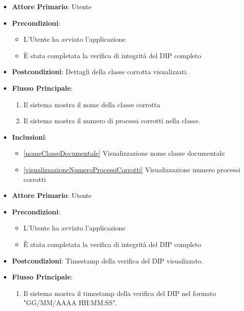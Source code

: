 \begin{itemize}
    \item \textbf{Attore Primario}: Utente
    \item \textbf{Precondizioni}: 
        \begin{itemize}
            \item L'Utente ha avviato l'applicazione
            \item È stata completata la verifica di integrità del DIP completo
        \end{itemize}
    \item \textbf{Postcondizioni}: Dettagli della classe corrotta visualizzati.
    \item \textbf{Flusso Principale}:
        \begin{enumerate}
            \item Il sistema mostra il nome della classe corrotta
            \item Il sistema mostra il numero di processi corrotti nella classe.
        \end{enumerate}
    \item \textbf{Inclusioni}: \begin{itemize}
        \item \ref{nomeClasseDocumentale} Visualizzazione nome classe documentale
        \item \ref{visualizzazioneNumeroProcessiCorrotti} Visualizzazione numero processi corrotti
    \end{itemize}
\end{itemize}

\begin{itemize}
    \item \textbf{Attore Primario}: Utente
    \item \textbf{Precondizioni}: 
        \begin{itemize}
            \item L'Utente ha avviato l'applicazione
            \item È stata completata la verifica di integrità del DIP completo
        \end{itemize} 
    \item \textbf{Postcondizioni}: Timestamp della verifica del DIP visualizzato.     
    \item \textbf{Flusso Principale}:
        \begin{enumerate}
            \item Il sistema mostra il timestamp della verifica del DIP nel formato "GG/MM/AAAA HH:MM:SS".
        \end{enumerate}
\end{itemize}

